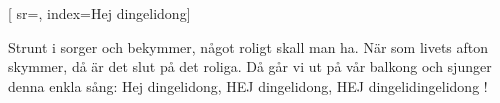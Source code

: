 [ 							
	sr={},
	index={Hej dingelidong}]		
	
\beginverse*						
Strunt i sorger och bekymmer,
något roligt skall man ha.
När som livets afton skymmer,
då är det slut på det roliga.
Då går vi ut på vår balkong
och sjunger denna enkla sång:
Hej dingelidong,
HEJ dingelidong,
HEJ dingelidingelidong !
\endverse					

\vspace{5mm}					
\endsong		
